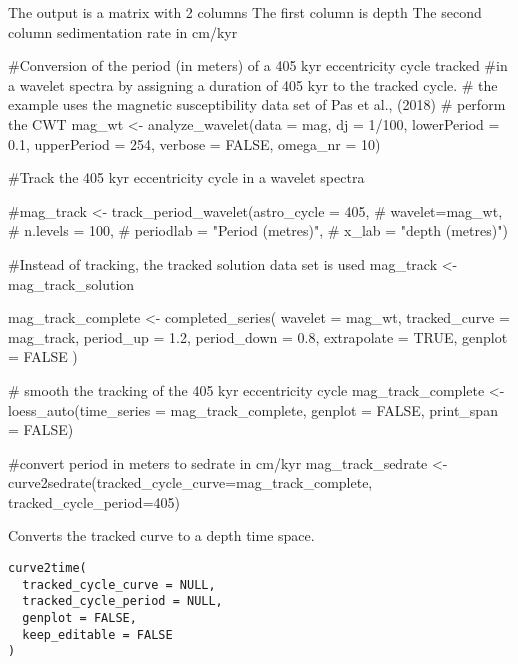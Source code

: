 \documentclass[a4paper]{book}
\begin{document}
%
\begin{Value}
The output is a matrix with 2 columns
The first column is depth
The second column sedimentation rate in cm/kyr
\end{Value}
%
\begin{Examples}
\begin{ExampleCode}

#Conversion of the period (in meters) of a 405 kyr eccentricity cycle tracked
#in a wavelet spectra by assigning a duration of  405 kyr to the tracked cycle.
# the example uses the magnetic susceptibility data set of Pas et al., (2018)
# perform the CWT
mag_wt <- analyze_wavelet(data = mag,
dj = 1/100,
lowerPeriod = 0.1,
upperPeriod = 254,
verbose = FALSE,
omega_nr = 10)

#Track the 405 kyr eccentricity cycle in a wavelet spectra

#mag_track <- track_period_wavelet(astro_cycle = 405,
#                                   wavelet=mag_wt,
#                                   n.levels = 100,
#                                   periodlab = "Period (metres)",
#                                   x_lab = "depth (metres)")

#Instead of tracking, the tracked solution data set  is used \cr
mag_track <- mag_track_solution

mag_track_complete <- completed_series(
  wavelet = mag_wt,
  tracked_curve = mag_track,
  period_up = 1.2,
  period_down = 0.8,
  extrapolate = TRUE,
  genplot = FALSE
)

# smooth the tracking of the 405 kyr eccentricity cycle
mag_track_complete <- loess_auto(time_series = mag_track_complete,
genplot = FALSE, print_span = FALSE)

#convert period in meters to sedrate in cm/kyr
mag_track_sedrate <- curve2sedrate(tracked_cycle_curve=mag_track_complete,
tracked_cycle_period=405)

\end{ExampleCode}
\end{Examples}
%
\begin{Description}
Converts the tracked curve to a depth time space.
\end{Description}
%
\begin{Usage}
\begin{verbatim}
curve2time(
  tracked_cycle_curve = NULL,
  tracked_cycle_period = NULL,
  genplot = FALSE,
  keep_editable = FALSE
)
\end{verbatim}
\end{Usage}
\end{document}
